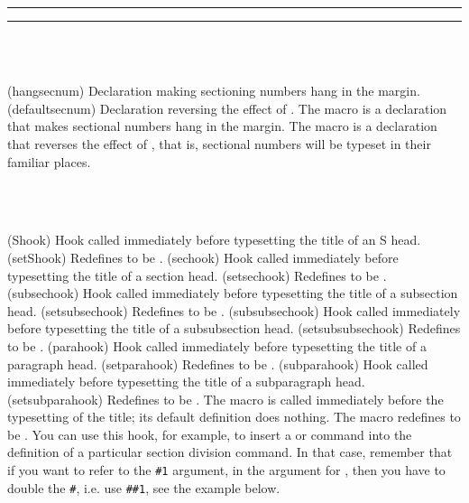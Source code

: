 \fancybreak{$*$}
\fancybreak{}

\begin{syntax}
\cmd{\hangsecnum} \\
 \\
\end{syntax}
\glossary(hangsecnum)%
  {}%
  {Declaration making sectioning numbers hang in the margin.}
\glossary(defaultsecnum)%
  {}%
  {Declaration reversing the effect of .}
The macro \cmd{\hangsecnum} is a declaration that makes sectional numbers hang
in the margin. The macro  is a declaration that reverses the
effect of \cmd{\hangsecnum}, that is, sectional numbers will be typeset in
their familiar places.


\begin{syntax}
\cmd{\Shook} \\
\cmd{\setShook} \\
\end{syntax}
\glossary(Shook)%
  {}%
  {Hook called immediately before typesetting the title of an S head.}
\glossary(setShook)%
  {}%
  {Redefines  to be .}
\glossary(sechook)%
  {}%
  {Hook called immediately before typesetting the title of a section head.}
\glossary(setsechook)%
  {}%
  {Redefines  to be .}
\glossary(subsechook)%
  {}%
  {Hook called immediately before typesetting the title of a subsection head.}
\glossary(setsubsechook)%
  {}%
  {Redefines  to be .}
\glossary(subsubsechook)%
  {}%
  {Hook called immediately before typesetting the title of a subsubsection head.}
\glossary(setsubsubsechook)%
  {}%
  {Redefines  to be .}
\glossary(parahook)%
  {}%
  {Hook called immediately before typesetting the title of a paragraph head.}
\glossary(setparahook)%
  {}%
  {Redefines  to be .}
\glossary(subparahook)%
  {}%
  {Hook called immediately before typesetting the title of a subparagraph head.}
\glossary(setsubparahook)%
  {}%
  {Redefines  to be .}
The macro \cmd{\Shook} is called immediately before the typesetting of the
title; its default definition does nothing. The macro \cmd{\setShook}
redefines \cmd{\Shook} to be . You can use this hook, for example,
to insert a \cmd{\sethangfrom} or \cmd{\setsecnumformat} command into the
definition of a particular section division command. In that case,
remember that if you want to refer to the \verb|#1| argument, in the
argument for \cmd{\setsecnumformat}, then you have to double the
\verb|#|, i.e. use \verb|##1|, see the example below.


